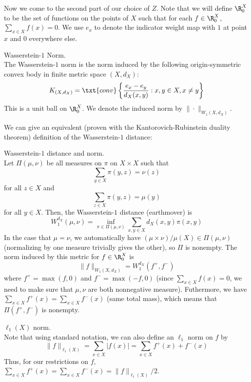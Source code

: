 Now we come to the second part of our choice of $Z$. Note that we will define $\R_0^X$ to be the set of functions on the points of $X$ such that for each $f \in \R_0^X$, $\sum_{x \in X} f(x) = 0$. We use $e_x$ to denote the indicator weight map with $1$ at point $x$ and $0$ everywhere else.

\begin{df} Wasserstein-$1$ Norm. \\
The Wasserstein-$1$ norm is the norm induced by the following origin-symmetric convex body in finite metric space $(X, d_X)$:
\[
K_{(X, d_X)} = \txt{conv}\left\{\frac{e_x - e_y}{d_X(x, y)}: x, y \in X, x \neq y \right\}
\]
This is a unit ball on $\R_0^X$. We denote the induced norm by $\|\cdot\|_{W_1(X, d_X)}$. 
\end{df}

We can give an equivalent (proven with the Kantorovich-Rubinstein duality theorem) definition of the Wasserstein-$1$ distance:
\begin{df} Wasserstein-$1$ distance and norm. \\
Let $\Pi(\mu, \nu)$ be all measures on $\pi$ on $X \times X$ such that 
\[
\sum_{y \in X} \pi(y, z) = \nu(z)
\]
for all $z \in X$
and 
\[
\sum_{z \in X} \pi(y, z) = \mu(y)
\]
for all $y \in X$. Then, the Wasserstein-$1$ distance (earthmover) is 
\[
W_1^{d_X}(\mu, \nu) = \inf_{\pi \in \Pi(\mu, \nu)} \sum_{x, y \in X} d_X(x, y) \pi(x, y)
\]
In the case that $\mu = \nu$, we automatically have $(\mu \times \nu)/\mu(X) \in \Pi(\mu, \nu)$ (normalizing by one measure trivially gives the other), so $\Pi$ is nonempty.
The norm induced by this metric for $f \in \R_0^X$ is
\[
\|f\|_{W_1(X, d_X)} = W_1^{d_X}(f^+, f^-)
\]
where $f^+ = \max(f, 0)$ and $f^- = \max(-f, 0)$ (since $\sum_{x \in X} f(x) = 0$, we need to make sure that $\mu, \nu$ are both nonnegative measure).
Futhermore, we have $\sum_{x \in X} f^+(x) = \sum_{x \in X} f^-(x)$ (same total mass), which means that $\Pi(f^+, f^-)$ is nonempty.
\end{df}

\begin{df} $\ell_1(X)$ norm. \\
Note that using standard notation, we can also define an $\ell_1$ norm on $f$ by 
\[
\|f\|_{\ell_1(X)} = \sum_{x \in X} |f(x)| = \sum_{x \in X} f^+(x) + f^-(x)
\]
Thus, for our restrictions on $f$, $\sum_{x \in X} f^+(x) = \sum_{x \in X} f^-(x) = \|f\|_{\ell_1(X)}/2$.
\end{df}

